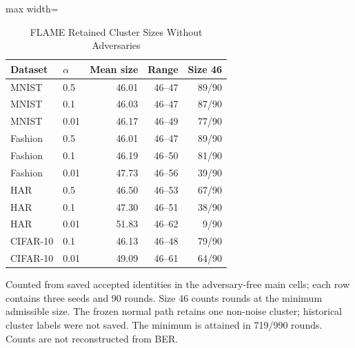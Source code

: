 \begin{table}[!t]
\centering\footnotesize
\setlength{\tabcolsep}{4pt}
\caption{FLAME Retained Cluster Sizes Without Adversaries}\label{tab:flame_sizes}
\begin{adjustbox}{max width=\columnwidth}
\begin{tabular}{llrrr}
\toprule
Dataset & $\alpha$ & Mean size & Range & Size 46 \\
\midrule
MNIST & 0.5 & 46.01 & 46--47 & 89/90 \\
MNIST & 0.1 & 46.03 & 46--47 & 87/90 \\
MNIST & 0.01 & 46.17 & 46--49 & 77/90 \\
Fashion & 0.5 & 46.01 & 46--47 & 89/90 \\
Fashion & 0.1 & 46.19 & 46--50 & 81/90 \\
Fashion & 0.01 & 47.73 & 46--56 & 39/90 \\
HAR & 0.5 & 46.50 & 46--53 & 67/90 \\
HAR & 0.1 & 47.30 & 46--51 & 38/90 \\
HAR & 0.01 & 51.83 & 46--62 & 9/90 \\
CIFAR-10 & 0.1 & 46.13 & 46--48 & 79/90 \\
CIFAR-10 & 0.01 & 49.09 & 46--61 & 64/90 \\
\bottomrule
\end{tabular}
\end{adjustbox}

\par\vspace{3pt}\parbox{\linewidth}{\footnotesize Counted from saved accepted identities in the adversary-free main cells; each row contains three seeds and 90 rounds. Size 46 counts rounds at the minimum admissible size. The frozen normal path retains one non-noise cluster; historical cluster labels were not saved. The minimum is attained in 719/990 rounds. Counts are not reconstructed from BER.}
\end{table}
